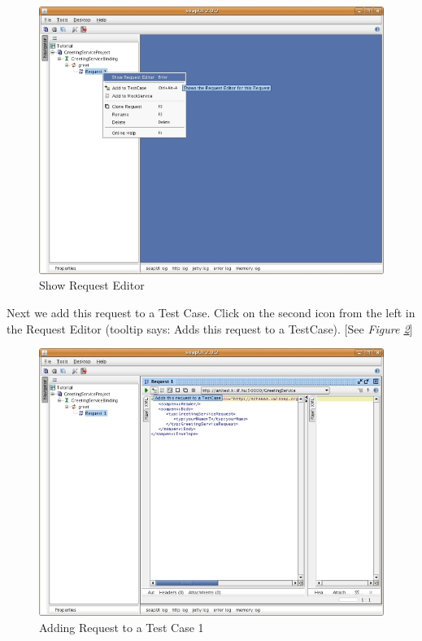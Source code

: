 \documentclass{article}
\begin{document}
\begin{figure}[!hbp]
\begin{center}
\includegraphics{fig/ARC1PythonDGDraft-img3_resize.jpg}
\caption{Show Request Editor}
\label{fig:showreqed}
\end{center}
\end{figure}

Next we add this request to a Test Case. Click on the second icon from
the left in the Request Editor (tooltip says: Adds this request to a
TestCase). [See \emph{Figure \ref{fig:addreq2tc}}]

\begin{figure}
\begin{center}
\includegraphics{fig/ARC1PythonDGDraft-img4_resize.jpg}
\caption{Adding Request to a Test Case 1}
\label{fig:addreq2tc}
\end{center}
\end{figure}
\end{document}
